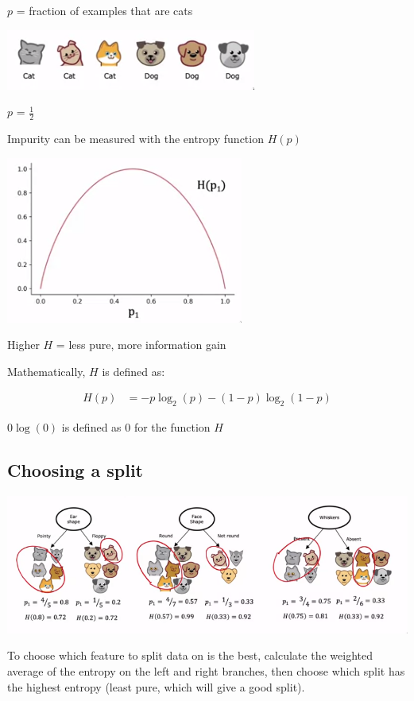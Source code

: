 \documentclass[12pt]{article}
\begin{document}
$p$ = fraction of examples that are cats

\includegraphics{purity}

$p$ = $\frac{1}{2}$

Impurity can be measured with the entropy function $H(p)$

\includegraphics{entropy}

Higher $H$ = less pure, more information gain

Mathematically, $H$ is defined as:

\begin{align*}
    H(p) &= -p \log_2(p) - (1 - p) \log_2(1 - p)
\end{align*}

$0 \log(0)$ is defined as 0 for the function $H$

\subsection{Choosing a split}

\includegraphics[scale=.6]{split}

To choose which feature to split data on is the best, calculate the weighted average of the entropy on the left
and right branches, then choose which split has the highest entropy (least pure, which will give a good split).\\
\end{document}
